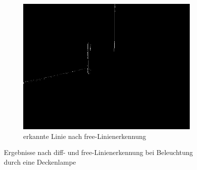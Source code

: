 \documentclass[ngerman,a4paper,parskip=half]{scrartcl}
\begin{document}
\begin{figure}[H]
\begin{subfigure}{0.32\textwidth}
		\includegraphics[width=\textwidth]{includes/blue_t_free.png}
		\caption{erkannte Linie nach free-Linienerkennung}
		\label{fig:blue_t_free}
	\end{subfigure}
	\caption{Ergebnisse nach diff- und free-Linienerkennung bei Beleuchtung durch eine Deckenlampe}
	\label{fig:blue_t}
\end{figure}
\end{document}
